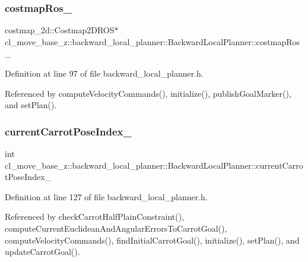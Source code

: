 \subsubsection{\texorpdfstring{costmap\+Ros\+\_\+}{costmapRos\_}}
{\footnotesize\ttfamily costmap\+\_\+2d\+::\+Costmap2\+D\+R\+OS$\ast$ cl\+\_\+move\+\_\+base\+\_\+z\+::backward\+\_\+local\+\_\+planner\+::\+Backward\+Local\+Planner\+::costmap\+Ros\+\_\+\hspace{0.3cm}{\ttfamily [private]}}



Definition at line 97 of file backward\+\_\+local\+\_\+planner.\+h.



Referenced by compute\+Velocity\+Commands(), initialize(), publish\+Goal\+Marker(), and set\+Plan().

\mbox{\label{classcl__move__base__z_1_1backward__local__planner_1_1BackwardLocalPlanner_a2e8f2b78bc97f27c5fa431f3af2261ed}} 
\subsubsection{\texorpdfstring{current\+Carrot\+Pose\+Index\+\_\+}{currentCarrotPoseIndex\_}}
{\footnotesize\ttfamily int cl\+\_\+move\+\_\+base\+\_\+z\+::backward\+\_\+local\+\_\+planner\+::\+Backward\+Local\+Planner\+::current\+Carrot\+Pose\+Index\+\_\+\hspace{0.3cm}{\ttfamily [private]}}



Definition at line 127 of file backward\+\_\+local\+\_\+planner.\+h.



Referenced by check\+Carrot\+Half\+Plain\+Constraint(), compute\+Current\+Euclidean\+And\+Angular\+Errors\+To\+Carrot\+Goal(), compute\+Velocity\+Commands(), find\+Initial\+Carrot\+Goal(), initialize(), set\+Plan(), and update\+Carrot\+Goal().

